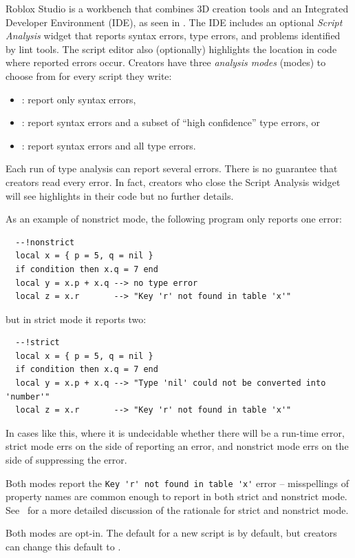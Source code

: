 \documentclass[english,submission,cleveref]{programming}
\begin{document}
{Roblox Studio} is a workbench that
combines {3D creation} tools and an Integrated
Developer Environment (IDE), as seen in .
The IDE includes an optional \emph{Script Analysis} widget that
reports syntax errors, type errors, and problems identified by
lint tools. The script editor also (optionally) highlights
the location in code where reported errors occur.
Creators have three \emph{analysis modes} (modes) to choose from
for every script they write:
\begin{itemize}
  \item \mnocheck{}: report only syntax errors,
  \item \mnonstrict{}: report syntax errors and a subset of ``high confidence'' type errors, or
  \item \mstrict{}: report syntax errors and all type errors.
\end{itemize}
Each run of type analysis can report several errors.
There is no guarantee that creators read every error.
In fact, creators who close the Script Analysis widget
will see highlights in their code but no further details.

As an example of nonstrict mode, the following program only reports one error:
\begin{verbatim}
  --!nonstrict
  local x = { p = 5, q = nil }
  if condition then x.q = 7 end
  local y = x.p + x.q --> no type error
  local z = x.r       --> "Key 'r' not found in table 'x'"
\end{verbatim}
but in strict mode it reports two:
\begin{verbatim}
  --!strict
  local x = { p = 5, q = nil }
  if condition then x.q = 7 end
  local y = x.p + x.q --> "Type 'nil' could not be converted into 'number'"
  local z = x.r       --> "Key 'r' not found in table 'x'"
\end{verbatim}
In cases like this, where it is undecidable whether there will be a run-time error,
strict mode errs on the side of reporting an error, and nonstrict mode errs on
the side of suppressing the error.

Both modes report the \verb|Key 'r' not found in table 'x'| error --
misspellings of property names are common enough to report in both
strict and nonstrict mode. See~\cite{bfj-hatra-2021}
for a more detailed discussion of the rationale for strict and nonstrict mode.

Both modes are opt-in. The default for a new script is \mnocheck{} by
default, but creators can change this default to \mnonstrict{}.
\end{document}
